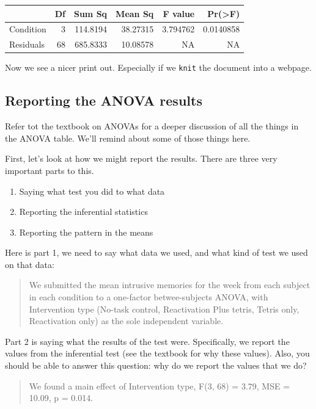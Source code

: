 \documentclass[
]{book}
\providecommand{\tightlist}{%
  \setlength{\itemsep}{0pt}\setlength{\parskip}{0pt}}
\begin{document}
\begin{tabular}{l|r|r|r|r|r}
\hline
  & Df & Sum Sq & Mean Sq & F value & Pr(>F)\\
\hline
Condition & 3 & 114.8194 & 38.27315 & 3.794762 & 0.0140858\\
\hline
Residuals & 68 & 685.8333 & 10.08578 & NA & NA\\
\hline
\end{tabular}

Now we see a nicer print out. Especially if we \texttt{knit} the document into a webpage.

\hypertarget{reporting-the-anova-results}{%
\subsection{Reporting the ANOVA results}\label{reporting-the-anova-results}}

Refer tot the textbook on ANOVAs for a deeper discussion of all the things in the ANOVA table. We'll remind about some of those things here.

First, let's look at how we might report the results. There are three very important parts to this.

\begin{enumerate}
\def\labelenumi{\arabic{enumi}.}
\tightlist
\item
  Saying what test you did to what data
\item
  Reporting the inferential statistics
\item
  Reporting the pattern in the means
\end{enumerate}

Here is part 1, we need to say what data we used, and what kind of test we used on that data:

\begin{quote}
We submitted the mean intrusive memories for the week from each subject in each condition to a one-factor betwee-subjects ANOVA, with Intervention type (No-task control, Reactivation Plus tetris, Tetris only, Reactivation only) as the sole independent variable.
\end{quote}

Part 2 is saying what the results of the test were. Specifically, we report the values from the inferential test (see the textbook for why these values). Also, you should be able to answer this question: why do we report the values that we do?

\begin{quote}
We found a main effect of Intervention type, F(3, 68) = 3.79, MSE = 10.09, p = 0.014.
\end{quote}
\end{document}
